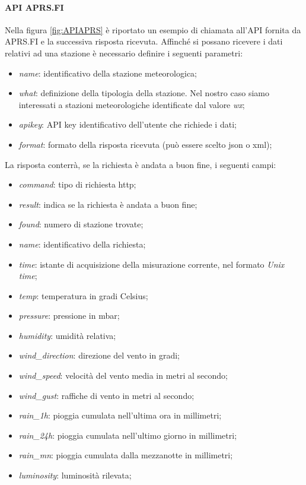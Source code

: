 \paragraph{API APRS.FI}\label{par:APRSAPI}
Nella figura \Fig\ref{fig:APIAPRS} è riportato un esempio di chiamata all'API fornita da APRS.FI e la successiva risposta ricevuta.
Affinché si possano ricevere i dati relativi ad una stazione è necessario definire i seguenti parametri:
\begin{itemize}
	\item \textit{name}: identificativo della stazione meteorologica;
	\item \textit{what}: definizione della tipologia della stazione. Nel nostro caso siamo interessati a stazioni meteorologiche identificate dal valore \textit{wx};
	\item \textit{apikey}: API key identificativo dell'utente che richiede i dati;
	\item \textit{format}: formato della risposta ricevuta (può essere scelto json o xml);
\end{itemize}
La risposta conterrà, se la richiesta è andata a buon fine, i seguenti campi:
\begin{itemize}
	\item \textit{command}: tipo di richiesta http;
	\item \textit{result}: indica se la richiesta è andata a buon fine;
	\item \textit{found}: numero di stazione trovate;
	\item \textit{name}: identificativo della richiesta;
	\item \textit{time}: istante di acquisizione della misurazione corrente, nel formato \textit{Unix time};
	\item \textit{temp}: temperatura in gradi Celsius;
	\item \textit{pressure}: pressione in mbar;
	\item \textit{humidity}: umidità relativa;
	\item \textit{wind\_direction}: direzione del vento in gradi;
	\item \textit{wind\_speed}: velocità del vento media in metri al secondo;
	\item \textit{wind\_gust}: raffiche di vento in metri al secondo;
	\item \textit{rain\_1h}: pioggia cumulata nell'ultima ora in millimetri;
	\item \textit{rain\_24h}: pioggia cumulata nell'ultimo giorno in millimetri;
	\item \textit{rain\_mn}: pioggia cumulata dalla mezzanotte in millimetri;
	\item \textit{luminosity}: luminosità rilevata;
\end{itemize}

